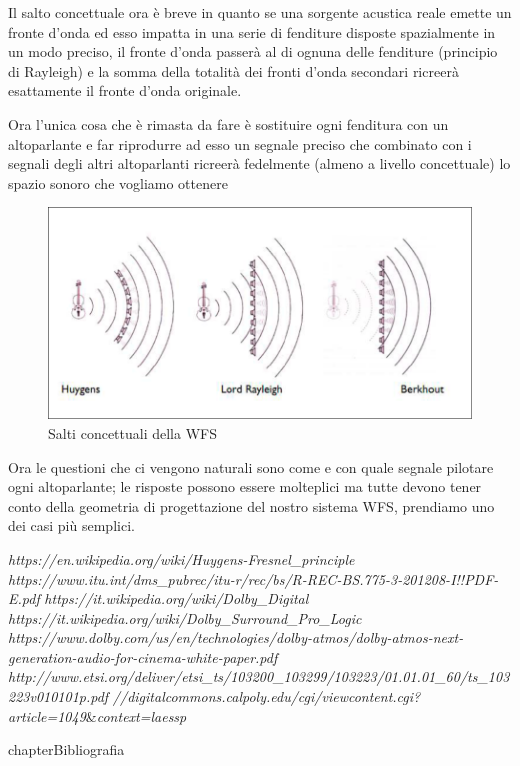 \documentclass[12pt,a4paper]{report}
\begin{document}
Il salto concettuale ora è breve in quanto se una sorgente acustica reale emette un fronte d'onda ed esso impatta in una serie di fenditure disposte spazialmente in un modo preciso, il fronte d'onda passerà al di ognuna delle fenditure (principio di Rayleigh) e la somma della totalità dei fronti d'onda secondari ricreerà esattamente il fronte d'onda originale.

Ora l'unica cosa che è rimasta da fare è sostituire ogni fenditura con un altoparlante e far riprodurre ad esso un  segnale preciso che combinato con i segnali degli altri altoparlanti ricreerà fedelmente (almeno a livello concettuale) lo spazio sonoro che vogliamo ottenere

\begin{figure}[htbp]
	\centering
	\includegraphics[scale=0.55]{figures/wfs.png}
	\caption {Salti concettuali della WFS} 
	\label{fig:wfs}
	\end{figure}
	

Ora le questioni che ci vengono naturali sono come e con quale segnale pilotare ogni altoparlante; le risposte possono essere molteplici ma tutte devono tener conto della geometria di progettazione del nostro sistema WFS, prendiamo uno dei casi più semplici.\\






\begin{thebibliography}{}

 \textit{https://en.wikipedia.org/wiki/Huygens-Fresnel\_principle}
 \textit{https://www.itu.int/dms\_pubrec/itu-r/rec/bs/R-REC-BS.775-3-201208-I!!PDF-E.pdf}
 \textit{https://it.wikipedia.org/wiki/Dolby\_Digital}
 \textit{https://it.wikipedia.org/wiki/Dolby\_Surround\_Pro\_Logic}
 \textit{https://www.dolby.com/us/en/technologies/dolby-atmos/dolby-atmos-next-generation-audio-for-cinema-white-paper.pdf}
\textit{http://www.etsi.org/deliver/etsi\_ts/103200\_103299/103223/01.01.01\_60/ts\_103223v010101p.pdf}
\textit{//digitalcommons.calpoly.edu/cgi/viewcontent.cgi?article=1049}\&\textit{context=laessp}

\end{thebibliography}
 {chapter}{Bibliografia}
\end{document}
